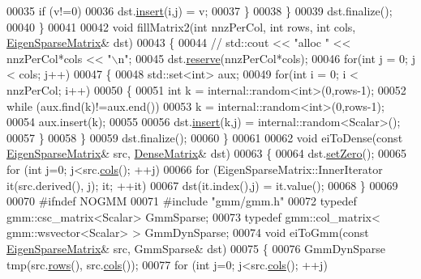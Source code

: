 \begin{DoxyCode}
00035       \textcolor{keywordflow}{if} (v!=0)
00036         dst.\hyperlink{group___sparse_core___module_aae45e3b5fec7f6a0cdd10eec7c6d3666}{insert}(i,j) = v;
00037     \}
00038   \}
00039   dst.finalize();
00040 \}
00041 
00042 \textcolor{keywordtype}{void} fillMatrix2(\textcolor{keywordtype}{int} nnzPerCol, \textcolor{keywordtype}{int} rows, \textcolor{keywordtype}{int} cols,  \hyperlink{group___sparse_core___module}{EigenSparseMatrix}& dst)
00043 \{
00044 \textcolor{comment}{//   std::cout << "alloc " << nnzPerCol*cols << "\(\backslash\)n";}
00045   dst.\hyperlink{group___sparse_core___module_a1518e58ac49bed0e2385b722a034f7d3}{reserve}(nnzPerCol*cols);
00046   \textcolor{keywordflow}{for}(\textcolor{keywordtype}{int} j = 0; j < cols; j++)
00047   \{
00048     std::set<int> aux;
00049     \textcolor{keywordflow}{for}(\textcolor{keywordtype}{int} i = 0; i < nnzPerCol; i++)
00050     \{
00051       \textcolor{keywordtype}{int} k = internal::random<int>(0,rows-1);
00052       \textcolor{keywordflow}{while} (aux.find(k)!=aux.end())
00053         k = internal::random<int>(0,rows-1);
00054       aux.insert(k);
00055 
00056       dst.\hyperlink{group___sparse_core___module_aae45e3b5fec7f6a0cdd10eec7c6d3666}{insert}(k,j) = internal::random<Scalar>();
00057     \}
00058   \}
00059   dst.finalize();
00060 \}
00061 
00062 \textcolor{keywordtype}{void} eiToDense(\textcolor{keyword}{const} \hyperlink{group___sparse_core___module}{EigenSparseMatrix}& src, \hyperlink{group___core___module}{DenseMatrix}& dst)
00063 \{
00064   dst.\hyperlink{class_eigen_1_1_plain_object_base_ac21ad5f989f320e46958b75ac8d9a1da}{setZero}();
00065   \textcolor{keywordflow}{for} (\textcolor{keywordtype}{int} j=0; j<src.\hyperlink{group___sparse_core___module_aa391750e3c530227e4a5c3c52e959975}{cols}(); ++j)
00066     \textcolor{keywordflow}{for} (EigenSparseMatrix::InnerIterator it(src.derived(), j); it; ++it)
00067       dst(it.index(),j) = it.value();
00068 \}
00069 
00070 \textcolor{preprocessor}{#ifndef NOGMM}
00071 \textcolor{preprocessor}{#include "gmm/gmm.h"}
00072 \textcolor{keyword}{typedef} gmm::csc\_matrix<Scalar> GmmSparse;
00073 \textcolor{keyword}{typedef} gmm::col\_matrix< gmm::wsvector<Scalar> > GmmDynSparse;
00074 \textcolor{keywordtype}{void} eiToGmm(\textcolor{keyword}{const} \hyperlink{group___sparse_core___module}{EigenSparseMatrix}& src, GmmSparse& dst)
00075 \{
00076   GmmDynSparse tmp(src.\hyperlink{group___sparse_core___module_a62e61bb861eee306d5b069ce652b5aa5}{rows}(), src.\hyperlink{group___sparse_core___module_aa391750e3c530227e4a5c3c52e959975}{cols}());
00077   \textcolor{keywordflow}{for} (\textcolor{keywordtype}{int} j=0; j<src.\hyperlink{group___sparse_core___module_aa391750e3c530227e4a5c3c52e959975}{cols}(); ++j)

\end{DoxyCode}
